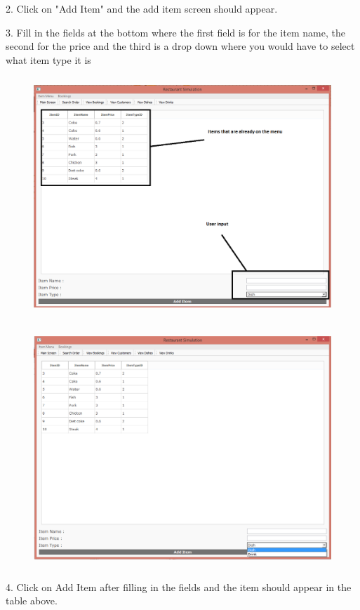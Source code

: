 2. Click on "Add Item" and the add item screen should appear.

3. Fill in the fields at the bottom where the first field is for the item name, the second for the price and the third is a drop down where you would have to select what item type it is

\begin{figure}[H]
    \includegraphics[height = 9cm]{./Manual/images/AddItem2} 
    \caption{} \label{fig:additem2}
\end{figure}

\begin{figure}[H]
    \includegraphics[height = 9cm]{./Manual/images/AddItem3} 
    \caption{} \label{fig:additem3}
\end{figure}

4. Click on Add Item after filling in the fields and the item should appear in the table above.

